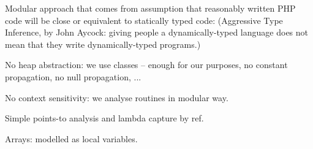         \begin{itemize*}
            \item Modular approach that comes from assumption that 
                reasonably written PHP code will be close or equivalent to 
                statically typed code: (Aggressive Type Inference, by John Aycock: giving people 
                a dynamically-typed language does not mean that they write dynamically-typed programs.)
                \begin{itemize*}
                    \item No heap abstraction: we use classes -- enough for our purposes, no constant propagation, no null propagation, ...
                    \item No context sensitivity: we analyse routines in modular way.
                    \item Simple points-to analysis and lambda capture by ref.
                    \item Arrays: modelled as local variables.
                \end{itemize*}
        \end{itemize*}
        
